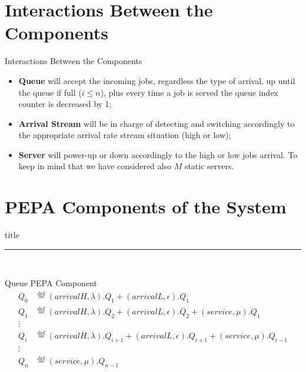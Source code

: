 \documentclass[8pt]{beamer}
\newcommand*{\defeq}{\stackrel{\text{def}}{=}}
\begin{document}
\section{Interactions Between the Components}
    \begin{frame}{Interactions Between the Components}
        \begin{itemize}
            \item \textbf{Queue} will accept the incoming jobs, regardless the type of arrival, up until the queue if full (\(i \leq n\)), plus every time a job is served the queue index counter is decreased by 1;
            \item \textbf{Arrival Stream} will be in charge of detecting and switching accordingly to the appropriate arrival rate stream situation (high or low);
            \item \textbf{Server} will power-up or down accordingly to the high or low jobs arrival. To keep in mind that we have considered also \(M\) static servers.
        \end{itemize}
    \end{frame}

\section{PEPA Components of the System}
    \begin{frame}[plain]
        \vfill
        \centering
        \begin{beamercolorbox}[sep=8pt,center,shadow=true,rounded=true]{title}
            \insertsectionhead\par
            \color{univered}\noindent\rule{10cm}{1pt} \\
            \LARGE{\faFileTextO}
        \end{beamercolorbox}
        \vfill
    \end{frame}

    \begin{frame}{Queue PEPA Component}
        \begin{align*} 
            Q_{0} &\defeq (arrivalH, \lambda).Q_{1} + (arrivalL, \epsilon).Q_{1} \\
            Q_{1} &\defeq (arrivalH, \lambda).Q_{2} + (arrivalL, \epsilon).Q_{2} + (service, \mu).Q_{1} \\
            \vdots \\
            Q_{i} &\defeq (arrivalH, \lambda).Q_{i+1} + (arrivalL, \epsilon).Q_{i+1} + (service, \mu).Q_{i-1} \\
            \vdots \\
            Q_{n} &\defeq (service, \mu).Q_{n-1}
        \end{align*}
    \end{frame}
\end{document}
